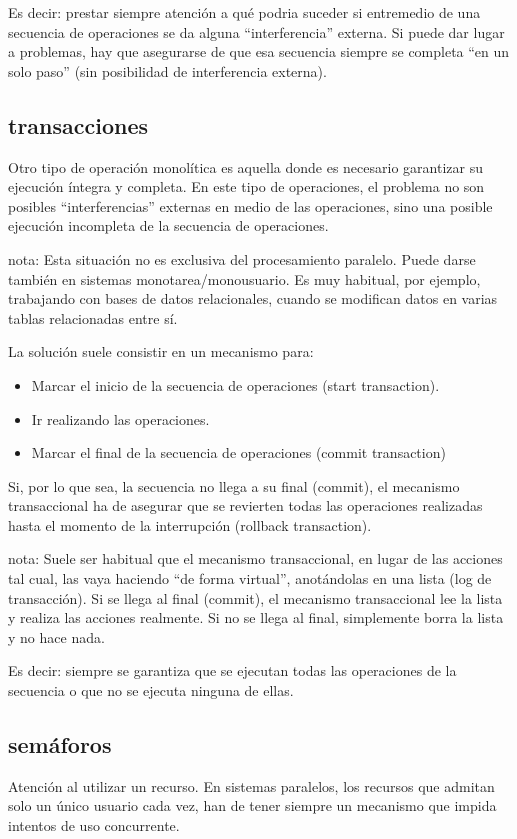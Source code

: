 \documentclass[spanish,12pt,a4paper,final,oneside]{book}
\begin{document}
Es decir: prestar siempre atención a qué podria suceder si entremedio de una secuencia de operaciones se da alguna ``interferencia'' externa. Si puede dar lugar a problemas, hay que asegurarse de que esa secuencia siempre se completa ``en un solo paso'' (sin posibilidad de interferencia externa).

\subsection{transacciones}
Otro tipo de operación monolítica es aquella donde es necesario garantizar su ejecución íntegra y completa. En este tipo de operaciones, el problema no son posibles ``interferencias'' externas en medio de las operaciones, sino una posible ejecución incompleta de la secuencia de operaciones.

nota: Esta situación no es exclusiva del procesamiento paralelo. Puede darse también en sistemas monotarea/monousuario. Es muy habitual, por ejemplo, trabajando con bases de datos relacionales, cuando se modifican datos en varias tablas relacionadas entre sí.

La solución suele consistir en un mecanismo para:
\begin{itemize}
\item Marcar el inicio de la secuencia de operaciones (start transaction).
\item Ir realizando las operaciones.
\item Marcar el final de la secuencia de operaciones (commit transaction)
\end{itemize}

Si, por lo que sea, la secuencia no llega a su final (commit), el mecanismo transaccional ha de asegurar que se revierten todas las operaciones realizadas hasta el momento de la interrupción (rollback transaction).

nota: Suele ser habitual que el mecanismo transaccional, en lugar de las acciones tal cual, las vaya haciendo ``de forma virtual'', anotándolas en una lista (log de transacción). Si se llega al final (commit), el mecanismo transaccional lee la lista y realiza las acciones realmente. Si no se llega al final, simplemente borra la lista y no hace nada. 

Es decir: siempre se garantiza que se ejecutan todas las operaciones de la secuencia o que no se ejecuta ninguna de ellas.

\subsection{semáforos}
Atención al utilizar un recurso. En sistemas paralelos, los recursos que admitan solo un único usuario cada vez, han de tener siempre un mecanismo que impida intentos de uso concurrente.
\end{document}
